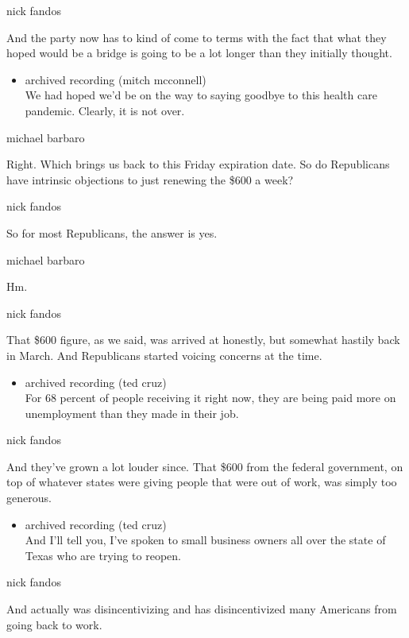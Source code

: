 nick fandos

And the party now has to kind of come to terms with the fact that what
they hoped would be a bridge is going to be a lot longer than they
initially thought.

\begin{itemize}
\tightlist
\item
  archived recording (mitch mcconnell)\\
  We had hoped we'd be on the way to saying goodbye to this health care
  pandemic. Clearly, it is not over.
\end{itemize}

michael barbaro

Right. Which brings us back to this Friday expiration date. So do
Republicans have intrinsic objections to just renewing the \$600 a week?

nick fandos

So for most Republicans, the answer is yes.

michael barbaro

Hm.

nick fandos

That \$600 figure, as we said, was arrived at honestly, but somewhat
hastily back in March. And Republicans started voicing concerns at the
time.

\begin{itemize}
\tightlist
\item
  archived recording (ted cruz)\\
  For 68 percent of people receiving it right now, they are being paid
  more on unemployment than they made in their job.
\end{itemize}

nick fandos

And they've grown a lot louder since. That \$600 from the federal
government, on top of whatever states were giving people that were out
of work, was simply too generous.

\begin{itemize}
\tightlist
\item
  archived recording (ted cruz)\\
  And I'll tell you, I've spoken to small business owners all over the
  state of Texas who are trying to reopen.
\end{itemize}

nick fandos

And actually was disincentivizing and has disincentivized many Americans
from going back to work.

